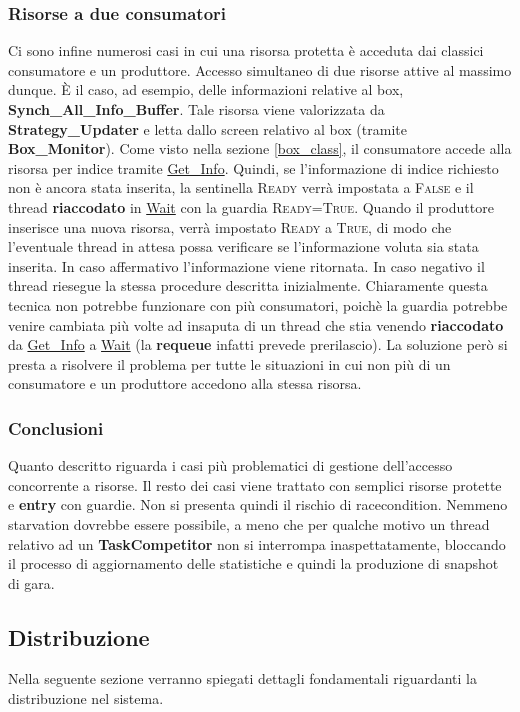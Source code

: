 \subsubsection{Risorse a due consumatori}
Ci sono infine numerosi casi in cui una risorsa protetta \`{e} acceduta dai classici consumatore e un produttore. Accesso simultaneo di due risorse attive al massimo dunque.
\`{E} il caso, ad esempio, delle informazioni relative al box, \textbf{Synch\_All\_Info\_Buffer}. Tale risorsa viene valorizzata da \textbf{Strategy\_Updater} e 
letta dallo screen relativo al box (tramite \textbf{Box\_Monitor}). Come visto nella sezione \ref{box_class}, il consumatore accede alla risorsa per indice tramite 
\underline{Get\_Info}. Quindi,
se l'informazione di indice richiesto non \`{e} ancora stata inserita, la sentinella \textsc{Ready} verr\`{a} impostata a \textsc{False} e il thread \textbf{riaccodato} in \underline{Wait}
con la guardia \textsc{Ready=True}. Quando il produttore inserisce una nuova risorsa, verr\`{a} impostato \textsc{Ready} a \textsc{True}, di modo che l'eventuale
thread in attesa possa verificare se l'informazione voluta sia stata inserita. In caso affermativo l'informazione viene ritornata. In caso negativo il thread riesegue
la stessa procedure descritta inizialmente. Chiaramente questa tecnica non potrebbe funzionare con pi\`{u} consumatori, poich\`{e} la guardia potrebbe venire cambiata
pi\`{u} volte ad insaputa di un thread che stia venendo \textbf{riaccodato} da \underline{Get\_Info} a \underline{Wait} (la \textbf{requeue} infatti prevede prerilascio). La
soluzione per\`{o} si presta a risolvere il problema per tutte le situazioni in cui non pi\`{u} di un consumatore e un produttore accedono alla stessa risorsa.
\subsubsection{Conclusioni}
Quanto descritto riguarda i casi pi\`{u} problematici di gestione dell'accesso concorrente a risorse. Il resto dei casi viene trattato con semplici risorse protette
e \textbf{entry} con guardie. Non si presenta quindi il rischio di racecondition. Nemmeno starvation dovrebbe essere possibile, 
a meno che per qualche motivo un thread relativo ad un \textbf{TaskCompetitor}
non si interrompa inaspettatamente, bloccando il processo di aggiornamento delle statistiche e quindi la produzione di snapshot di gara.
\subsection{Distribuzione}
Nella seguente sezione verranno spiegati dettagli fondamentali riguardanti la distribuzione nel sistema.
